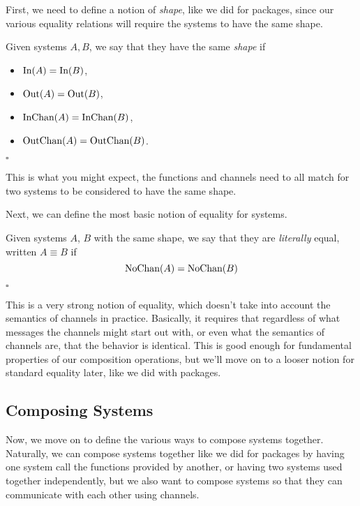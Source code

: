 First, we need to define a notion of \emph{shape}, like we did
for packages, since our various equality relations will
require the systems to have the same shape.

\begin{definition}
  Given systems $A, B$, we say that they have the same \emph{shape} if
  \begin{itemize}
    \item $\text{In}(A) = \text{In}(B)$,
    \item $\text{Out}(A) = \text{Out}(B)$,
    \item $\text{InChan}(A) = \text{InChan}(B)$,
    \item $\text{OutChan}(A) = \text{OutChan}(B)$.
  \end{itemize}

  $\square$
\end{definition}

This is what you might expect, the functions and channels need to all
match for two systems to be considered to have the same shape.

Next, we can define the most basic notion of equality for systems.

\begin{definition}
  Given systems $A$, $B$ with the same shape, we say that they are \emph{literally} equal, written $A \equiv B$ if
  $$
  \text{NoChan}(A) = \text{NoChan}(B)
  $$

  $\square$
\end{definition}

This is a very strong notion of equality, which doesn't take
into account the semantics of channels in practice.
Basically, it requires that regardless of what messages the channels
might start out with, or even what the semantics of channels are,
that the behavior is identical.
This is good enough for fundamental properties of our composition
operations, but we'll move on to a looser notion for standard equality
later, like we did with packages.

\subsection{Composing Systems}

Now, we move on to define the various ways to compose systems together.
Naturally, we can compose systems together like we did for packages
by having one system call the functions provided by another,
or having two systems used together independently,
but we also want to compose systems so that they can communicate
with each other using channels.

